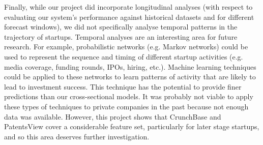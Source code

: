 \documentclass[../thesis/thesis.tex]{subfiles}
\begin{document}
Finally, while our project did incorporate longitudinal analyses (with respect to evaluating our system's performance against historical datasets and for different forecast windows), we did not specifically analyse temporal patterns in the trajectory of startups. Temporal analyses are an interesting area for future research. For example, probabilistic networks (e.g. Markov networks) could be used to represent the sequence and timing of different startup activities (e.g. media coverage, funding rounds, IPOs, hiring, etc.). Machine learning techniques could be applied to these networks to learn patterns of activity that are likely to lead to investment success. This technique has the potential to provide finer predictions than our cross-sectional models. It was probably not viable to apply these types of techniques to private companies in the past because not enough data was available. However, this project shows that CrunchBase and PatentsView cover a considerable feature set, particularly for later stage startups, and so this area deserves further investigation.

\end{document}
